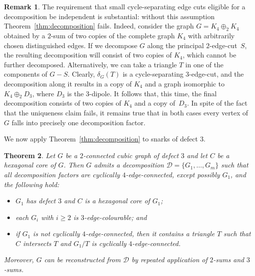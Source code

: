 \documentclass[a4paper]{amsart}
\theoremstyle{plain}
\newtheorem{theorem}{Theorem}[section]
\theoremstyle{definition}
\newtheorem{remark}[theorem]{Remark}
\begin{document}
\begin{remark}
The requirement that small cycle-separating edge cuts eligible
for a decomposition be independent is substantial: without this
assumption Theorem~\ref{thm:decomposition} fails. Indeed,
consider the graph $G=K_4\oplus_2 K_4$ obtained by a $2$-sum of
two copies of the complete graph $K_4$ with arbitrarily chosen
distinguished edges. If we decompose $G$ along the principal
$2$-edge-cut~$S$, the resulting decomposition will consist of
two copies of $K_4$, which cannot be further decomposed.
Alternatively, we can take a triangle $T$ in one of the
components of $G-S$. Clearly, $\delta_G(T)$ is a
cycle-separating $3$-edge-cut, and the decomposition along it
results in a copy of $K_4$ and a graph isomorphic to
$K_4\oplus_2 D_3$, where $D_3$ is the $3$-dipole. It follows
that, this time, the final decomposition consists of two copies
of $K_4$ and a copy of~$D_3$. In spite of the fact that the
uniqueness claim fails, it remains true that in both cases
every vertex of $G$ falls into precisely one decomposition
factor.
\end{remark}

We now apply Theorem~\ref{thm:decomposition} to snarks of
defect $3$.

\begin{theorem}\label{thm:decomp-def3}
Let $G$ be a $2$-connected cubic graph of defect $3$ and let
$C$ be a hexagonal core of $G$. Then $G$ admits a decomposition
$\mathcal{D}=\{G_1,\dots,G_m\}$ such that all decomposition
factors are cyclically $4$-edge-connected, except possibly
$G_1$, and the following hold:
\begin{itemize}
\item[{\rm (i)}] $G_1$ has defect $3$ and $C$ is a
    hexagonal core of $G_1$;
\item[{\rm (ii)}] each $G_i$ with $i\ge 2$ is
    $3$-edge-colourable; and
\item[{\rm (iii)}] if $G_1$ is not cyclically
    $4$-edge-connected, then it contains a triangle $T$
    such that $C$ intersects $T$ and $G_1/T$ is cyclically
    $4$-edge-connected.
\end{itemize}
Moreover, $G$ can be reconstructed from $\mathcal{D}$ by
repeated application of $2$-sums and $3$-sums.
\end{theorem}
\end{document}
